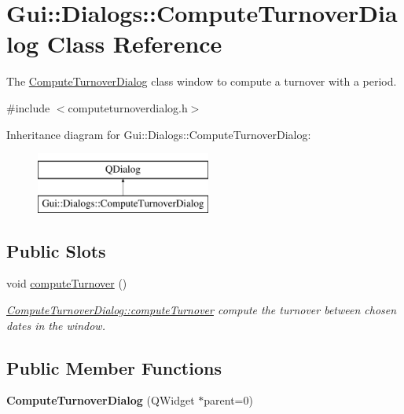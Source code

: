 \hypertarget{classGui_1_1Dialogs_1_1ComputeTurnoverDialog}{\section{Gui\-:\-:Dialogs\-:\-:Compute\-Turnover\-Dialog Class Reference}
\label{classGui_1_1Dialogs_1_1ComputeTurnoverDialog}
}


The \hyperlink{classGui_1_1Dialogs_1_1ComputeTurnoverDialog}{Compute\-Turnover\-Dialog} class window to compute a turnover with a period.  




{\ttfamily \#include $<$computeturnoverdialog.\-h$>$}

Inheritance diagram for Gui\-:\-:Dialogs\-:\-:Compute\-Turnover\-Dialog\-:\begin{figure}[H]
\begin{center}
\leavevmode
\includegraphics[height=2.000000cm]{d1/d0e/classGui_1_1Dialogs_1_1ComputeTurnoverDialog}
\end{center}
\end{figure}
\subsection*{Public Slots}
\begin{DoxyCompactItemize}
\item 
\hypertarget{classGui_1_1Dialogs_1_1ComputeTurnoverDialog_ab4d2a48bffed8c09e3d16e2849fd4b0e}{void \hyperlink{classGui_1_1Dialogs_1_1ComputeTurnoverDialog_ab4d2a48bffed8c09e3d16e2849fd4b0e}{compute\-Turnover} ()}\label{classGui_1_1Dialogs_1_1ComputeTurnoverDialog_ab4d2a48bffed8c09e3d16e2849fd4b0e}

\begin{DoxyCompactList}\small\item\em \hyperlink{classGui_1_1Dialogs_1_1ComputeTurnoverDialog_ab4d2a48bffed8c09e3d16e2849fd4b0e}{Compute\-Turnover\-Dialog\-::compute\-Turnover} compute the turnover between chosen dates in the window. \end{DoxyCompactList}\end{DoxyCompactItemize}
\subsection*{Public Member Functions}
\begin{DoxyCompactItemize}
\item 
\hypertarget{classGui_1_1Dialogs_1_1ComputeTurnoverDialog_a0f720f3d04ef26c3086e18a9d1e1606d}{{\bfseries Compute\-Turnover\-Dialog} (Q\-Widget $\ast$parent=0)}\label{classGui_1_1Dialogs_1_1ComputeTurnoverDialog_a0f720f3d04ef26c3086e18a9d1e1606d}

\end{DoxyCompactItemize}


